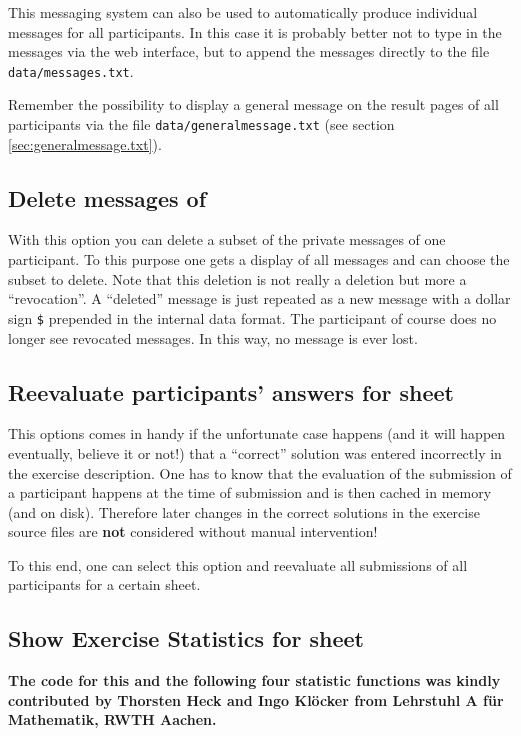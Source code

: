 \documentclass[12pt,openany,a4paper]{book}
\begin{document}
This messaging system can also be used to automatically produce individual
messages for all participants. In this case it is probably better not to
type in the messages via the web interface, but to append the messages directly
to the file \texttt{data/messages.txt}.

Remember the possibility to display a general message on the result pages
of all participants via the file \texttt{data/generalmessage.txt}
(see section \ref{sec:generalmessage.txt}).

\subsection{Delete messages of}

With this option you can delete a subset of the private messages of one
participant. To this purpose one gets a display of all messages and can
choose the subset to delete. Note that this deletion is not really a 
deletion but more a ``revocation''. A ``deleted'' message is just repeated
as a new message with a dollar sign \verb!$! prepended in the internal
data format. The participant of course does no longer see revocated messages.
In this way, no message is ever lost.

\subsection{Reevaluate participants' answers for sheet}\label{ssec:reeval}

This options comes in handy if the unfortunate case happens (and it will
happen eventually, believe it or not!) that a ``correct'' solution was
entered incorrectly in the exercise description. One has to know that
the evaluation of the submission of a participant happens at the time
of submission and is then cached in memory (and on disk). Therefore later
changes in the correct solutions in the exercise source files are \textbf{not}
considered without manual intervention!

To this end, one can select this option and reevaluate all submissions of
all participants for a certain sheet.


\subsection{Show Exercise Statistics for sheet}

\textbf{The code for this and the following four statistic functions was kindly
contributed by Thorsten Heck and Ingo Klöcker from Lehrstuhl A für
Mathematik, RWTH Aachen.}
\bigskip
\end{document}
